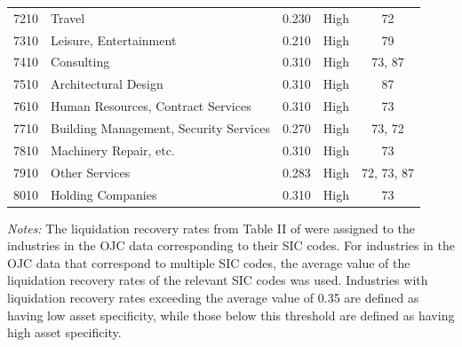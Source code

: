 \begin{table}[ht]
\begin{threeparttable}
\begin{tabular}{llccc}
7210 & Travel & 0.230 & High & 72 \\
7310 & Leisure, Entertainment & 0.210 & High & 79 \\
7410 & Consulting & 0.310 & High & 73, 87 \\
7510 & Architectural Design & 0.310 & High & 87 \\
7610 & Human Resources, Contract Services & 0.310 & High & 73 \\
7710 & Building Management, Security Services & 0.270 & High & 73, 72 \\
7810 & Machinery Repair, etc. & 0.310 & High & 73 \\
7910 & Other Services & 0.283 & High & 72, 73, 87 \\
8010 & Holding Companies & 0.310 & High & 73 \\
\bottomrule
\end{tabular}


\begin{tablenotes}
\item \textit{Notes: } 
 The liquidation recovery rates from Table II of \cite{kermani2023asset} were assigned to the industries in the OJC data corresponding to their SIC codes. For industries in the OJC data that correspond to multiple SIC codes, the average value of the liquidation recovery rates of the relevant SIC codes was used. Industries with liquidation recovery rates exceeding the average value of 0.35 are defined as having low asset specificity, while those below this threshold are defined as having high asset specificity.
 \end{tablenotes}
\end{threeparttable}

\end{table}